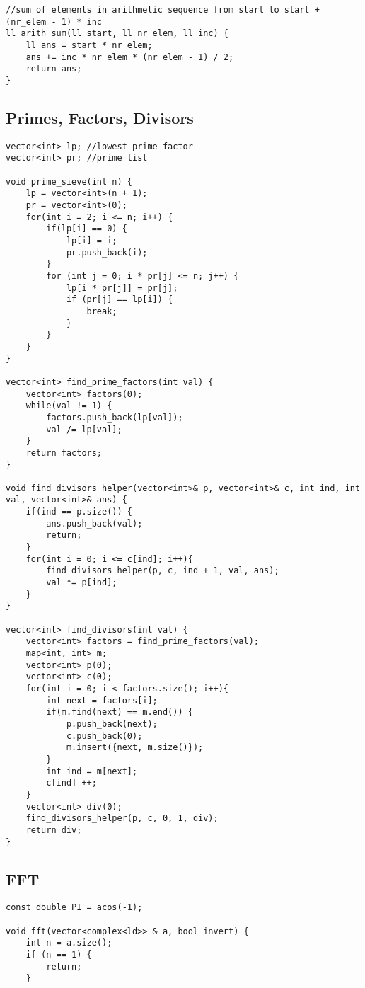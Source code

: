 \documentclass[8pt, headheight=10pt]{scrartcl}
\begin{document}
\begin{multicols*}{3}
\begin{lstlisting}
//sum of elements in arithmetic sequence from start to start + (nr_elem - 1) * inc
ll arith_sum(ll start, ll nr_elem, ll inc) {
    ll ans = start * nr_elem;
    ans += inc * nr_elem * (nr_elem - 1) / 2;
    return ans;
}
\end{lstlisting}

\subsection{Primes, Factors, Divisors}
\begin{lstlisting}
vector<int> lp; //lowest prime factor 
vector<int> pr; //prime list

void prime_sieve(int n) {
    lp = vector<int>(n + 1);
    pr = vector<int>(0);
    for(int i = 2; i <= n; i++) {
        if(lp[i] == 0) {
            lp[i] = i;
            pr.push_back(i);
        }
        for (int j = 0; i * pr[j] <= n; j++) {
            lp[i * pr[j]] = pr[j];
            if (pr[j] == lp[i]) {
                break;
            }
        }
    }
}

vector<int> find_prime_factors(int val) {
    vector<int> factors(0);
    while(val != 1) {
        factors.push_back(lp[val]);
        val /= lp[val];
    }
    return factors;
}

void find_divisors_helper(vector<int>& p, vector<int>& c, int ind, int val, vector<int>& ans) {
    if(ind == p.size()) {
        ans.push_back(val);
        return;
    }
    for(int i = 0; i <= c[ind]; i++){
        find_divisors_helper(p, c, ind + 1, val, ans);
        val *= p[ind];
    }
}

vector<int> find_divisors(int val) {
    vector<int> factors = find_prime_factors(val);
    map<int, int> m;
    vector<int> p(0);
    vector<int> c(0);
    for(int i = 0; i < factors.size(); i++){
        int next = factors[i];
        if(m.find(next) == m.end()) {
            p.push_back(next);
            c.push_back(0);
            m.insert({next, m.size()});
        }
        int ind = m[next];
        c[ind] ++;
    }
    vector<int> div(0);
    find_divisors_helper(p, c, 0, 1, div);
    return div;
}
\end{lstlisting}

\subsection{FFT}
\begin{lstlisting}
const double PI = acos(-1);

void fft(vector<complex<ld>> & a, bool invert) {
    int n = a.size();
    if (n == 1) {
        return;
    }


\end{lstlisting}
\end{multicols*}
\end{document}
